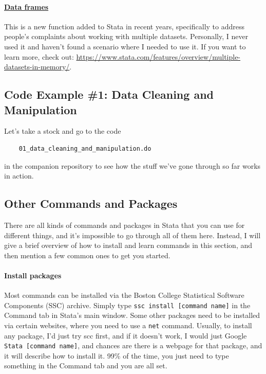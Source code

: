 \paragraph{\underline{Data frames}} This is a new function added to Stata in recent years, specifically to address people's complaints about working with multiple datasets. Personally, I never used it and haven't found a scenario where I needed to use it. If you want to learn more, check out: \url{https://www.stata.com/features/overview/multiple-datasets-in-memory/}.

\subsection{Code Example \#1: Data Cleaning and Manipulation}
Let's take a stock and go to the code 
\begin{verbatim}
    01_data_cleaning_and_manipulation.do
\end{verbatim}
in the companion repository to see how the stuff we've gone through so far works in action. 

\subsection{Other Commands and Packages}
There are all kinds of commands and packages in Stata that you can use for different things, and it's impossible to go through all of them here. Instead, I will give a brief overview of how to install and learn commands in this section, and then mention a few common ones to get you started. 

\paragraph{Install packages} Most commands can be installed via the Boston College Statistical Software Components (SSC) archive. Simply type \verb|ssc install [command name]| in the Command tab in Stata's main window. Some other packages need to be installed via certain websites, where you need to use a \verb|net| command. Usually, to install any package, I'd just try scc first, and if it doesn't work, I would just Google \verb|Stata [command name]|, and chances are there is a webpage for that package, and it will describe how to install it. 99\% of the time, you just need to type something in the Command tab and you are all set. 

